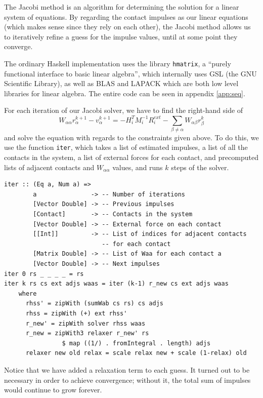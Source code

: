 \documentclass[runningheads,a4paper]{llncs}
\begin{document}
The Jacobi method is an algorithm for determining the solution for a linear
system of equations. By regarding the contact impulses as our linear equations
(which makes sense since they rely on each other), the Jacobi method allows us
to iteratively refine a guess for the impulse values, until at some point they
converge.

The ordinary Haskell implementation uses the library \verb+hmatrix+, a ``purely
functional interface to basic linear algebra'', which internally uses GSL (the
GNU Scientific Library), as well as BLAS and LAPACK which are both low level
libraries for linear algebra. The entire code can be seen in appendix
\ref{app:seq}.

For each iteration of our Jacobi solver, we have to find the right-hand side of
\begin{equation} \label{lhs=rhs}
  W_{\alpha\alpha} r_\alpha^{k+1} - v_\alpha^{k+1}= - H_i^T M_i^{-1} R_i^{ext}
  - \sum\limits_{\beta \neq \alpha} W_{\alpha\beta} r_\beta^k
\end{equation}
and solve the equation with regards to the constraints given above. To do this,
we use the function \verb+iter+, which takes a list of estimated impulses, a
list of all the contacts in the system, a list of external forces for each
contact, and precomputed lists of adjacent contacts and $W_{\alpha\alpha}$
values, and runs $k$ steps of the solver.

\begin{verbatim}
iter :: (Eq a, Num a) =>
        a               -> -- Number of iterations
        [Vector Double] -> -- Previous impulses
        [Contact]       -> -- Contacts in the system
        [Vector Double] -> -- External force on each contact
        [[Int]]         -> -- List of indices for adjacent contacts
                           -- for each contact
        [Matrix Double] -> -- List of Waa for each contact a
        [Vector Double] -> -- Next impulses
iter 0 rs _ _ _ _ = rs
iter k rs cs ext adjs waas = iter (k-1) r_new cs ext adjs waas
    where
      rhss' = zipWith (sumWab cs rs) cs adjs
      rhss = zipWith (+) ext rhss'
      r_new' = zipWith solver rhss waas
      r_new = zipWith3 relaxer r_new' rs
                $ map ((1/) . fromIntegral . length) adjs
      relaxer new old relax = scale relax new + scale (1-relax) old
\end{verbatim}
Notice that we have added a relaxation term to each guess. It turned out to be
necessary in order to achieve convergence; without it, the total sum of
impulses would continue to grow forever.
\end{document}
